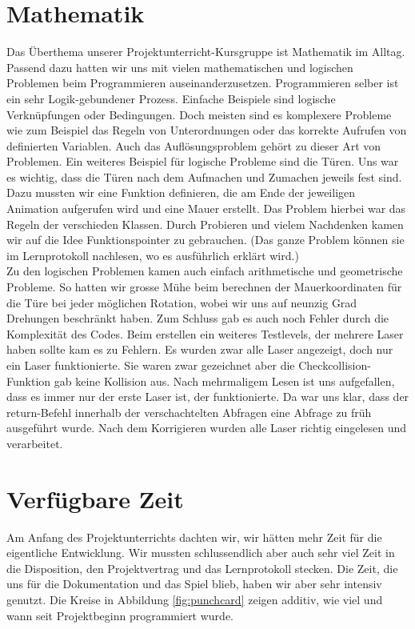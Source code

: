 \documentclass[11pt,a4paper]{scrbook}
\begin{document}
\section{Mathematik}
Das Überthema unserer Projektunterricht-Kursgruppe ist Mathematik im Alltag.
Passend dazu hatten wir uns mit vielen mathematischen und logischen Problemen beim Programmieren auseinanderzusetzen.
Programmieren selber ist ein sehr Logik-gebundener Prozess.
Einfache Beispiele sind logische Verknüpfungen oder Bedingungen.
Doch meisten sind es komplexere Probleme wie zum Beispiel das Regeln von Unterordnungen oder das korrekte Aufrufen von definierten Variablen.
Auch das Auflösungsproblem gehört zu dieser Art von Problemen.
Ein weiteres Beispiel für logische Probleme sind die Türen.
Uns war es wichtig, dass die Türen nach dem Aufmachen und Zumachen jeweils fest sind.
Dazu mussten wir eine Funktion definieren, die am Ende der jeweiligen Animation aufgerufen wird und eine Mauer erstellt.
Das Problem hierbei war das Regeln der verschieden Klassen.
Durch Probieren und vielem Nachdenken kamen wir auf die Idee Funktionspointer zu gebrauchen. 
(Das ganze Problem können sie im Lernprotokoll nachlesen, wo es ausführlich erklärt wird.)
\\
Zu den logischen Problemen kamen auch einfach arithmetische und geometrische Probleme.
So hatten wir grosse Mühe beim berechnen der Mauerkoordinaten für die Türe bei jeder möglichen Rotation, wobei wir uns auf neunzig Grad Drehungen beschränkt haben.
Zum Schluss gab es auch noch Fehler durch die Komplexität des Codes.
Beim erstellen ein weiteres Testlevels, der mehrere Laser haben sollte kam es zu Fehlern.
Es wurden zwar alle Laser angezeigt, doch nur ein Laser funktionierte.
Sie waren zwar gezeichnet aber die Checkcollision-Funktion gab keine Kollision aus. 
Nach mehrmaligem Lesen ist uns aufgefallen, dass es immer nur der erste Laser ist, der funktionierte. Da war uns klar, dass der return-Befehl innerhalb der verschachtelten Abfragen eine Abfrage zu früh ausgeführt wurde. Nach dem Korrigieren wurden alle Laser richtig eingelesen und verarbeitet.



\section{Verfügbare Zeit}
Am Anfang des Projektunterrichts dachten wir, wir hätten mehr Zeit für die eigentliche Entwicklung. Wir mussten schlussendlich aber auch
sehr viel Zeit in die Disposition, den Projektvertrag und das Lernprotokoll stecken. Die Zeit, die uns für die Dokumentation und das Spiel
blieb, haben wir aber sehr intensiv genutzt. Die Kreise in Abbildung \ref{fig:punchcard} zeigen additiv, wie viel und wann seit Projektbeginn programmiert wurde.
\end{document}
